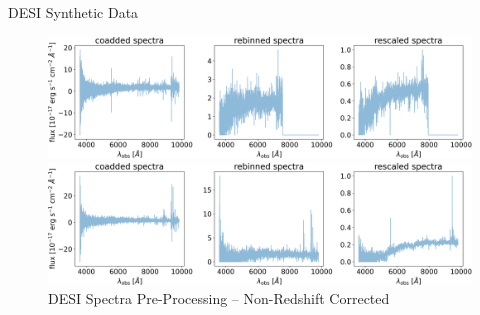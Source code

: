 \begin{frame}{DESI Synthetic Data}
    \begin{figure}[t!]
        \centering
        \includegraphics[width=.9\textwidth]{figures/preprocess/3600_Zcorrected_spectra.png}
        \caption{DESI Spectra Pre-Processing --  Redshift Corrected}
        \label{fig:spectra_preproc}
        \includegraphics[width=.9\textwidth]{figures/preprocess/3600_Zrestframe_spectra.png}
        \caption{DESI Spectra Pre-Processing --  Non-Redshift Corrected}
        \label{fig:sepctra_preproc_nored}
    \end{figure} 
\end{frame}

